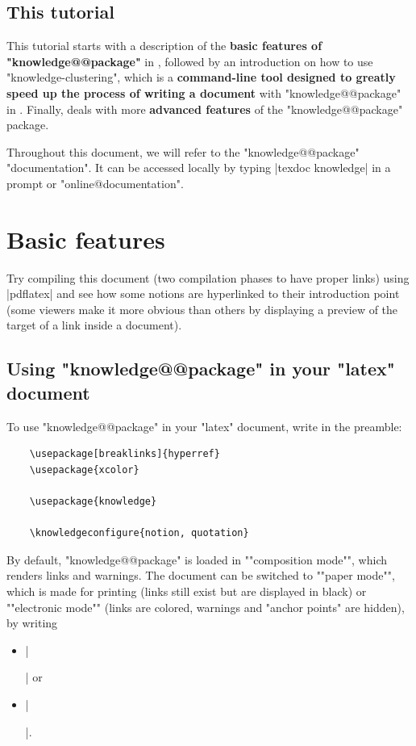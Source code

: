 \documentclass{article}
\begin{document}
\subsection{This tutorial}

This tutorial starts with a description of the \textbf{basic features of
"knowledge@@package"} in , followed by an
introduction on how to use "knowledge-clustering", which is a
\textbf{command-line tool designed to greatly
speed up the process of writing a document} with "knowledge@@package"
in . Finally, 
deals with more \textbf{advanced features} of the "knowledge@@package" package.

Throughout this document, we will refer to the "knowledge@@package" 
"documentation". It can be accessed locally by
typing \spverb|texdoc knowledge| in 
a prompt or "online@documentation".

\section{Basic features}
\label{sec:basic-features}

Try compiling this document (two compilation phases to have proper links) using \spverb|pdflatex| and see how some notions are hyperlinked to their introduction point (some viewers make it more obvious than others by displaying a preview of the target of a link inside a document).

\subsection{Using "knowledge@@package" in your "latex" document}

To use "knowledge@@package" in your "latex" document, write in the preamble:
\begin{verbatim}
    \usepackage[breaklinks]{hyperref} 
    \usepackage{xcolor} 

    \usepackage{knowledge}

    \knowledgeconfigure{notion, quotation}
\end{verbatim}

By default, "knowledge@@package" is loaded in \AP""composition mode"", which renders 
links and warnings. The document can be switched to \AP""paper mode"",
which is made for printing (links still exist but are displayed in black)
or \AP""electronic mode"" (links are colored, warnings and "anchor points"
are hidden), by writing
\begin{itemize}
    \item \spverb|\usepackage[paper]{knowledge}| or
    \item \spverb|\usepackage[electronic]{knowledge}|.
\end{itemize} 
\end{document}
